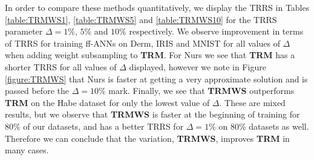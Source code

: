 \documentclass[letterpaper,12pt,titlepage,oneside,final]{book}
\begin{document}
	In order to compare these methods quantitatively, we display the TRRS in Tables \ref{table:TRMWS1}, \ref{table:TRMWS5} and \ref{table:TRMWS10} for the TRRS parameter $\Delta = 1\%$, $5\%$ and $10\%$ respectively. We observe improvement in terms of TRRS for training ff-ANNs on Derm, IRIS and MNIST for all values of $\Delta$ when adding weight subsampling to \textbf{TRM}. For Nurs we see that \textbf{TRM} has a shorter TRRS for all values of $\Delta$ displayed, however we note in Figure \ref{figure:TRMWS} that Nurs is faster at getting a very approximate solution and is passed before the $\Delta=10\%$ mark. Finally, we see that \textbf{TRMWS} outperforms \textbf{TRM} on the Habe dataset for only the lowest value of $\Delta$. These are mixed results, but we observe that \textbf{TRMWS} is faster at the beginning of training for $80\%$ of our datasets, and has a better TRRS for $\Delta=1\%$ on $80\%$ datasets as well. Therefore we can conclude that the variation, \textbf{TRMWS}, improves \textbf{TRM} in many cases.
	
\end{document}
